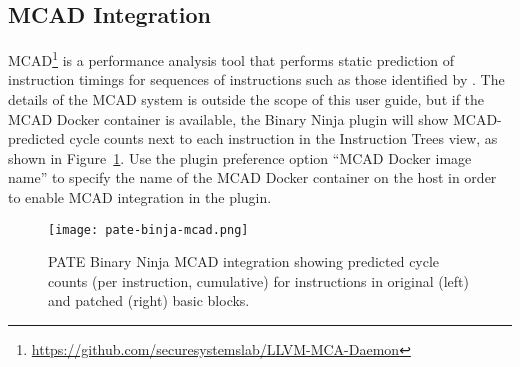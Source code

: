\subsection{MCAD Integration}

MCAD\footnote{\url{https://github.com/securesystemslab/LLVM-MCA-Daemon}} is a performance analysis tool that performs static prediction of instruction timings for sequences of instructions such as those identified by \pate{}.
The details of the MCAD system is outside the scope of this user guide, but if the MCAD Docker container is available, the \pate{} Binary Ninja plugin will show MCAD-predicted cycle counts next to each instruction in the Instruction Trees view, as shown in Figure~\ref{fig:mcad}.
Use the \pate{} plugin preference option ``MCAD Docker image name'' to specify the name of the MCAD Docker container on the host in order to enable MCAD integration in the \pate{} plugin.

\begin{figure}[h]
  \centering
  \texttt{[image: pate-binja-mcad.png]}
  \caption{PATE Binary Ninja MCAD integration showing predicted cycle counts (per instruction, cumulative) for instructions in original (left) and patched (right) basic blocks.}
  \label{fig:mcad}
\end{figure}